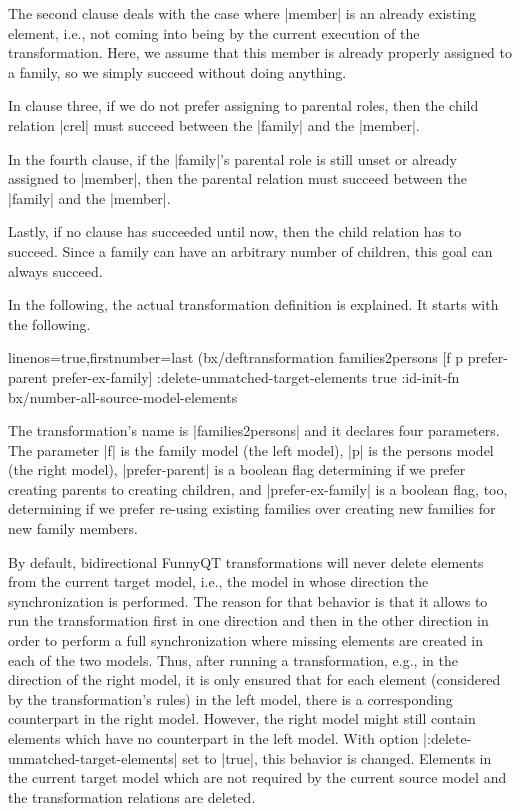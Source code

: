 \documentclass[a4paper]{article}
\newcommand{\code}{\clojureinline}
\begin{document}
The second clause deals with the case where \code|member| is an already
existing element, i.e., not coming into being by the current execution of the
transformation.  Here, we assume that this member is already properly assigned
to a family, so we simply succeed without doing anything.

In clause three, if we do not prefer assigning to parental roles, then the
child relation \code|crel| must succeed between the \code|family| and the
\code|member|.

In the fourth clause, if the \code|family|'s parental role is still unset or
already assigned to \code|member|, then the parental relation must succeed
between the \code|family| and the \code|member|.

Lastly, if no clause has succeeded until now, then the child relation has to
succeed.  Since a family can have an arbitrary number of children, this goal
can always succeed.

\bigskip{}

In the following, the actual transformation definition is explained.  It starts
with the following.

\begin{clojurecode*}{linenos=true,firstnumber=last}
(bx/deftransformation families2persons [f p prefer-parent prefer-ex-family]
  :delete-unmatched-target-elements true
  :id-init-fn bx/number-all-source-model-elements
\end{clojurecode*}

The transformation's name is \code|families2persons| and it declares four
parameters.  The parameter \code|f| is the family model (the left model),
\code|p| is the persons model (the right model), \code|prefer-parent| is a
boolean flag determining if we prefer creating parents to creating children,
and \code|prefer-ex-family| is a boolean flag, too, determining if we prefer
re-using existing families over creating new families for new family members.

By default, bidirectional FunnyQT transformations will never delete elements
from the current target model, i.e., the model in whose direction the
synchronization is performed.  The reason for that behavior is that it allows
to run the transformation first in one direction and then in the other
direction in order to perform a full synchronization where missing elements are
created in each of the two models.  Thus, after running a transformation, e.g.,
in the direction of the right model, it is only ensured that for each element
(considered by the transformation's rules) in the left model, there is a
corresponding counterpart in the right model.  However, the right model might
still contain elements which have no counterpart in the left model.  With
option \code|:delete-unmatched-target-elements| set to \code|true|, this
behavior is changed.  Elements in the current target model which are not
required by the current source model and the transformation relations are
deleted.
\end{document}
